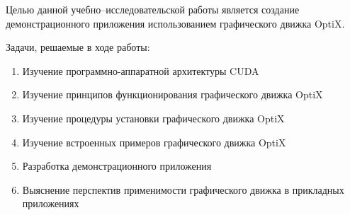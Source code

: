 Целью данной учебно--исследовательской работы является создание демонстрационного приложения использованием графического движка OptiX.

Задачи, решаемые в ходе работы:
\begin{enumerate}
\item Изучение  программно-аппаратной архитектуры CUDA
\item Изучение принципов функционирования графического движка OptiX
\item Изучение процедуры установки графического движка OptiX
\item Изучение встроенных примеров графического движка OptiX
\item Разработка демонстрационного приложения
\item Выяснение перспектив применимости графического движка в прикладных приложениях
\end{enumerate}
